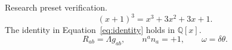 \documentclass{article}
\begin{document}
Research preset verification.
\begin{equation}\label{eq:identity}
  (x+1)^3=x^3+3x^2+3x+1.
\end{equation}
The identity in Equation~\eqref{eq:identity} holds in $\mathbb{Q}[x]$.
\[
  R_{ab}=\Lambda g_{ab},\qquad n^a n_a=+1,
  \qquad \omega=\delta\theta.
\]
\end{document}
